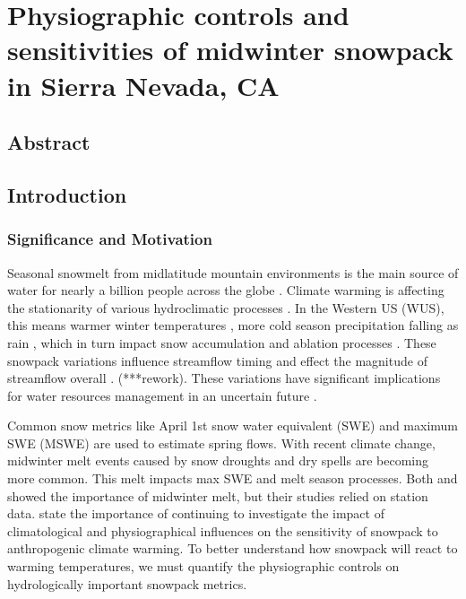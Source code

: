 \hypertarget{ch2}{%
\chapter{Physiographic controls and sensitivities of midwinter snowpack in Sierra Nevada, CA}\label{ch2}}

\hypertarget{ch2-abstract}{\section{Abstract}\label{ch2-abstract}}

\hypertarget{ch2-intro}{\section{Introduction}\label{ch2-intro}}
\subsection{Significance and Motivation}
Seasonal snowmelt from midlatitude mountain environments is the main source of water for nearly a billion people across the globe \citep{sturmWaterLifeSnow2017}.
Climate warming is affecting the stationarity of various hydroclimatic processes \citep{millyStationarityDeadWhither2008}. In the Western US (WUS), this means warmer winter temperatures \cite{gergelEffectsClimateChange2017}, more cold season precipitation falling as rain \citep{knowlesTrendsSnowfallRainfall2006}, which in turn impact snow accumulation and ablation processes \citep{kapnickCausesRecentChanges2012}. These snowpack variations influence streamflow timing \citep{stewartChangesSnowmeltRunoff2004} and effect the magnitude of streamflow overall \citep{barnhartSnowmeltRateDictates2016}. (***rework). These variations have significant implications for water resources management in an uncertain future \citep{livnehDroughtLessPredictable2020}.

Common snow metrics like April 1st snow water equivalent (SWE) and maximum SWE (MSWE) are used to estimate spring flows. With recent climate change, midwinter melt events caused by snow droughts \citep{harpoldDefiningSnowDrought2017} and dry spells \citep{hatchettMidwinterDrySpells2023} are becoming more common. This melt impacts max SWE and melt season processes. Both \cite{harpoldHumidityDeterminesSnowpack2018} and \cite{musselmanWinterMeltTrends2021} showed the importance of midwinter melt, but their studies relied on station data. \cite{musselmanWinterMeltTrends2021} state the importance of continuing to investigate the impact of climatological and physiographical influences on the sensitivity of snowpack to anthropogenic climate warming. To better understand how snowpack will react to warming temperatures, we must quantify the physiographic controls on hydrologically important snowpack metrics.

